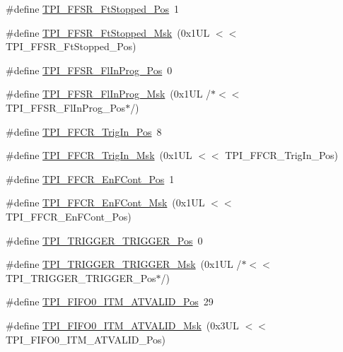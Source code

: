 \begin{DoxyCompactItemize}
\item 
\#define \hyperlink{group___c_m_s_i_s___t_p_i_gaedf31fd453a878021b542b644e2869d2}{T\+P\+I\+\_\+\+F\+F\+S\+R\+\_\+\+Ft\+Stopped\+\_\+\+Pos}~1
\item 
\#define \hyperlink{group___c_m_s_i_s___t_p_i_ga1ab6c3abe1cf6311ee07e7c479ce5f78}{T\+P\+I\+\_\+\+F\+F\+S\+R\+\_\+\+Ft\+Stopped\+\_\+\+Msk}~(0x1\+U\+L $<$$<$ T\+P\+I\+\_\+\+F\+F\+S\+R\+\_\+\+Ft\+Stopped\+\_\+\+Pos)
\item 
\#define \hyperlink{group___c_m_s_i_s___t_p_i_ga542ca74a081588273e6d5275ba5da6bf}{T\+P\+I\+\_\+\+F\+F\+S\+R\+\_\+\+Fl\+In\+Prog\+\_\+\+Pos}~0
\item 
\#define \hyperlink{group___c_m_s_i_s___t_p_i_ga63dfb09259893958962914fc3a9e3824}{T\+P\+I\+\_\+\+F\+F\+S\+R\+\_\+\+Fl\+In\+Prog\+\_\+\+Msk}~(0x1\+U\+L /$\ast$$<$$<$ T\+P\+I\+\_\+\+F\+F\+S\+R\+\_\+\+Fl\+In\+Prog\+\_\+\+Pos$\ast$/)
\item 
\#define \hyperlink{group___c_m_s_i_s___t_p_i_gaa7ea11ba6ea75b541cd82e185c725b5b}{T\+P\+I\+\_\+\+F\+F\+C\+R\+\_\+\+Trig\+In\+\_\+\+Pos}~8
\item 
\#define \hyperlink{group___c_m_s_i_s___t_p_i_ga360b413bc5da61f751546a7133c3e4dd}{T\+P\+I\+\_\+\+F\+F\+C\+R\+\_\+\+Trig\+In\+\_\+\+Msk}~(0x1\+U\+L $<$$<$ T\+P\+I\+\_\+\+F\+F\+C\+R\+\_\+\+Trig\+In\+\_\+\+Pos)
\item 
\#define \hyperlink{group___c_m_s_i_s___t_p_i_ga99e58a0960b275a773b245e2b69b9a64}{T\+P\+I\+\_\+\+F\+F\+C\+R\+\_\+\+En\+F\+Cont\+\_\+\+Pos}~1
\item 
\#define \hyperlink{group___c_m_s_i_s___t_p_i_ga27d1ecf2e0ff496df03457a2a97cb2c9}{T\+P\+I\+\_\+\+F\+F\+C\+R\+\_\+\+En\+F\+Cont\+\_\+\+Msk}~(0x1\+U\+L $<$$<$ T\+P\+I\+\_\+\+F\+F\+C\+R\+\_\+\+En\+F\+Cont\+\_\+\+Pos)
\item 
\#define \hyperlink{group___c_m_s_i_s___t_p_i_ga5517fa2ced64efbbd413720329c50b99}{T\+P\+I\+\_\+\+T\+R\+I\+G\+G\+E\+R\+\_\+\+T\+R\+I\+G\+G\+E\+R\+\_\+\+Pos}~0
\item 
\#define \hyperlink{group___c_m_s_i_s___t_p_i_ga814227af2b2665a0687bb49345e21110}{T\+P\+I\+\_\+\+T\+R\+I\+G\+G\+E\+R\+\_\+\+T\+R\+I\+G\+G\+E\+R\+\_\+\+Msk}~(0x1\+U\+L /$\ast$$<$$<$ T\+P\+I\+\_\+\+T\+R\+I\+G\+G\+E\+R\+\_\+\+T\+R\+I\+G\+G\+E\+R\+\_\+\+Pos$\ast$/)
\item 
\#define \hyperlink{group___c_m_s_i_s___t_p_i_gaa7e050e9eb6528241ebc6835783b6bae}{T\+P\+I\+\_\+\+F\+I\+F\+O0\+\_\+\+I\+T\+M\+\_\+\+A\+T\+V\+A\+L\+I\+D\+\_\+\+Pos}~29
\item 
\#define \hyperlink{group___c_m_s_i_s___t_p_i_ga94cb2493ed35d2dab7bd4092b88a05bc}{T\+P\+I\+\_\+\+F\+I\+F\+O0\+\_\+\+I\+T\+M\+\_\+\+A\+T\+V\+A\+L\+I\+D\+\_\+\+Msk}~(0x3\+U\+L $<$$<$ T\+P\+I\+\_\+\+F\+I\+F\+O0\+\_\+\+I\+T\+M\+\_\+\+A\+T\+V\+A\+L\+I\+D\+\_\+\+Pos)

\end{DoxyCompactItemize}
